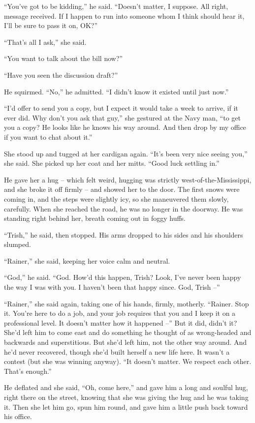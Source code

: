 “You've got to be kidding,” he said. “Doesn't matter, I suppose. 
All right, message received. If I happen to run into someone whom I 
think should hear it, I'll be sure to pass it on, OK?”

“That's all I ask,” she said.

“You want to talk about the bill now?”

“Have you seen the discussion draft?”

He squirmed. “No,” he admitted. “I didn't know it existed until 
just now.”

“I'd offer to send you a copy, but I expect it would take a week to 
arrive, if it ever did. Why don't you ask that guy,” she gestured at 
the Navy man, “to get you a copy? He looks like he knows his way 
around. And then drop by my office if you want to chat about it.”

She stood up and tugged at her cardigan again. “It's been very nice 
seeing you,” she said. She picked up her coat and her mitts. “Good 
luck settling in.”

He gave her a hug -- which felt weird, hugging was strictly 
west-of-the-Mississippi, and she broke it off firmly -- and showed her 
to the door. The first snows were coming in, and the steps were 
slightly icy, so she maneuvered them slowly, carefully. When she 
reached the road, he was no longer in the doorway. He was standing 
right behind her, breath coming out in foggy huffs.

“Trish,” he said, then stopped. His arms dropped to his sides and 
his shoulders slumped.

“Rainer,” she said, keeping her voice calm and neutral.

“God,” he said. “God. How'd this happen, Trish? Look, I've never 
been happy the way I was with you. I haven't been that happy since. 
God, Trish --”

“Rainer,” she said again, taking one of his hands, firmly, 
motherly. “Rainer. Stop it. You're here to do a job, and your job 
requires that you and I keep it on a professional level. It doesn't 
matter how it happened --” But it did, didn't it? She'd left him to 
come east and do something he thought of as wrong-headed and backwards 
and superstitious. But she'd left him, not the other way around. And 
he'd never recovered, though she'd built herself a new life here. It 
wasn't a contest (but she was winning anyway). “It doesn't matter. We 
respect each other. That's enough.”

He deflated and she said, “Oh, come here,” and gave him a long and 
soulful hug, right there on the street, knowing that she was giving the 
hug and he was taking it. Then she let him go, spun him round, and gave 
him a little push back toward his office.

